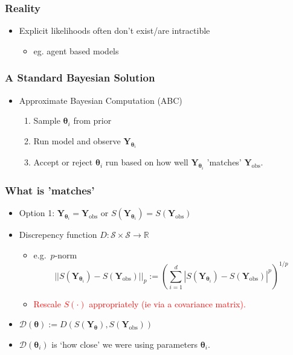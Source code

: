\documentclass{beamer}
\begin{document}
\begin{frame}
    \frametitle{Reality}
    \begin{itemize}
        \item Explicit likelihoods often don't exist/are intractible
              \begin{itemize}
                  \item eg. agent based models
              \end{itemize}
    \end{itemize}
\end{frame}

\begin{frame}
    \frametitle{A Standard Bayesian Solution}
    \begin{itemize}
        \item Approximate Bayesian Computation (ABC)\begin{enumerate}
                  \item Sample $\bm{\theta}_i$ from prior
                  \item Run model and observe $\mathbf{Y}_{\bm{\theta}_i}$
                  \item Accept or reject $\bm{\theta}_i$ run based on how well
                        $\mathbf{Y}_{\bm{\theta}_i}$ 'matches' $\mathbf{Y}_\text{obs}.$
              \end{enumerate}
    \end{itemize}
\end{frame}

\begin{frame}
    \frametitle{What is 'matches'}
    \begin{itemize}
        \item Option 1: $\mathbf{Y}_{\bm{\theta}_i} = \mathbf{Y}_\text{obs}$
              or $S(\mathbf{Y}_{\bm{\theta}_i}) = S(\mathbf{Y}_\text{obs})$
        \item <2-> Discrepency function $D:\mathcal{S}\times \mathcal{S} \to \mathbb{R}$ \begin{itemize}
                  \item e.g.\ $p$-norm
                        $$
                            ||S(\mathbf{Y}_{\bm{\theta}_i}) - S(\mathbf{Y}_\text{obs})||_p
                            :=(\sum_{i = 1}^d|S(\mathbf{Y}_{\bm{\theta}_i})
                            - S(\mathbf{Y}_\text{obs})|^p)^{1/p}
                        $$
                  \item <3-> \textcolor{red}{Rescale $S(\cdot)$ appropriately (ie via a covariance matrix).}
              \end{itemize}
        \item <4-> $\mathcal{D}(\bm{\theta}) := D(S(\mathbf{Y}_{\bm{\theta}}), S(\mathbf{Y}_\text{obs}))$
        \item <5-> $\mathcal{D}(\bm{\theta}_i)$ is `how close' we were using parameters $\bm{\theta}_i.$
    \end{itemize}
\end{frame}
\end{document}
